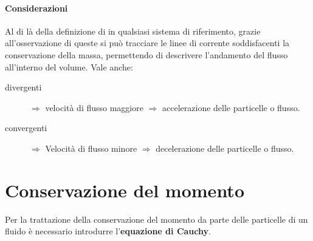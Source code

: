 \paragraph{Considerazioni}
Al di là della definizione di  in qualsiasi sistema di riferimento, grazie all'osservazione di queste si può tracciare le linee di corrente soddisfacenti la conservazione della massa, permettendo di descrivere l'andamento del flusso all'interno del volume.
Vale anche:
\begin{description}
\item[ divergenti] $\Rightarrow$ velocità di flusso maggiore $\Rightarrow$ accelerazione delle particelle o flusso.
\item[ convergenti] $\Rightarrow$ Velocità di flusso minore $\Rightarrow$ decelerazione delle particelle o flusso.
\end{description}

\section{Conservazione del momento}
Per la trattazione della conservazione del momento da parte delle particelle di un fluido è necessario introdurre l'\textbf{equazione di Cauchy}.


